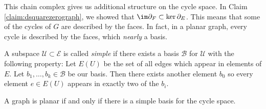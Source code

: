  This chain complex gives us additional structure on the cycle space. In Claim \ref{claim:dsquarezerograph}, we showed that $\im \partial_F\subset \ker \partial_E$. This means that some of the cycles of $G$ are described by the faces. In fact, in a planar graph, every cycle is described by the faces, which \emph{nearly} a basis. 
\begin{definition}
 A subspace $\mathcal U\subset \mathcal E$ is called \emph{simple} if there exists a basis $\mathcal B$ for $\mathcal U$ with the following property: Let $E(U)$ be the set of all edges which appear in elements of $E$. Let $b_1, \ldots, b_k\in \mathcal B$ be our basis. Then there exists another element $b_0$ so every element $e\in E(U)$ appears in exactly two of the $b_i$. 
\end{definition}

\begin{theorem}
 A graph is planar if and only if there is a simple basis for the cycle space. 
\end{theorem}
